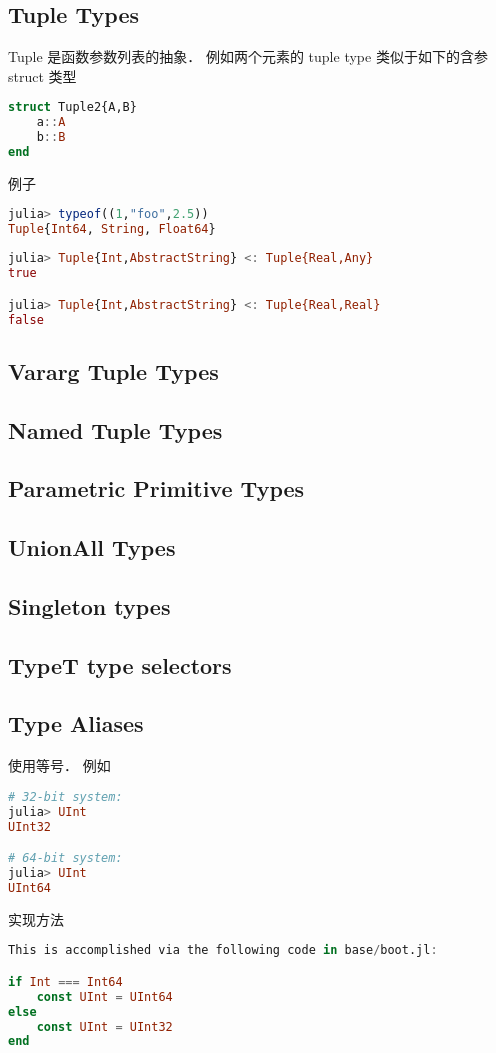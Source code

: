 \subsection{Tuple Types}
Tuple 是函数参数列表的抽象． 例如两个元素的 tuple type 类似于如下的含参 struct 类型
\begin{lstlisting}[language=julia]
struct Tuple2{A,B}
    a::A
    b::B
end
\end{lstlisting}
例子
\begin{lstlisting}[language=julia]
julia> typeof((1,"foo",2.5))
Tuple{Int64, String, Float64}
\end{lstlisting}
\begin{lstlisting}[language=julia]
julia> Tuple{Int,AbstractString} <: Tuple{Real,Any}
true

julia> Tuple{Int,AbstractString} <: Tuple{Real,Real}
false
\end{lstlisting}

\subsection{Vararg Tuple Types}

\subsection{Named Tuple Types}

\subsection{Parametric Primitive Types}

\subsection{UnionAll Types}

\subsection{Singleton types}

\subsection{Type{T} type selectors}

\subsection{Type Aliases}
使用等号． 例如
\begin{lstlisting}[language=julia]
# 32-bit system:
julia> UInt
UInt32

# 64-bit system:
julia> UInt
UInt64
\end{lstlisting}
实现方法
\begin{lstlisting}[language=julia]
This is accomplished via the following code in base/boot.jl:

if Int === Int64
    const UInt = UInt64
else
    const UInt = UInt32
end
\end{lstlisting}

